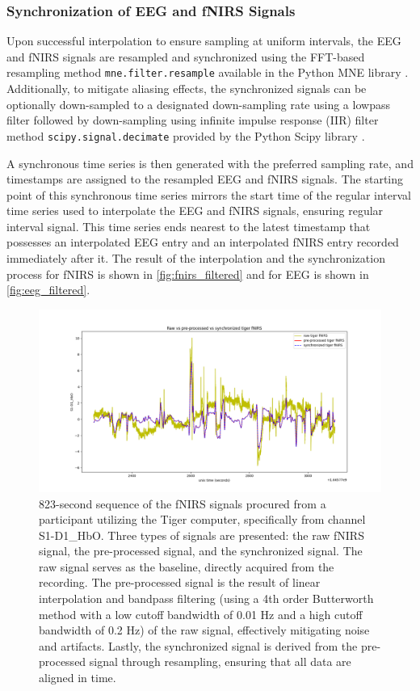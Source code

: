 \subsubsection{Synchronization of EEG and fNIRS Signals}

Upon successful interpolation to ensure sampling at uniform intervals, the EEG
and fNIRS signals are resampled and synchronized using the FFT-based resampling
method \texttt{mne.filter.resample} available in the Python MNE library
\cite{GramfortEtAl2013a}. Additionally, to mitigate aliasing effects, the
synchronized signals can be optionally down-sampled to a designated
down-sampling rate using a lowpass filter followed by down-sampling using
infinite impulse response (IIR) filter method \texttt{scipy.signal.decimate}
provided by the Python Scipy library \cite{2020SciPy-NMeth}.

A synchronous time series is then generated with the preferred sampling rate,
and timestamps are assigned to the resampled EEG and fNIRS signals. The
starting point of this synchronous time series mirrors the start time of the
regular interval time series used to interpolate the EEG and fNIRS signals,
ensuring regular interval signal. This time series ends nearest to the latest
timestamp that possesses an interpolated EEG entry and an interpolated fNIRS
entry recorded immediately after it. The result of the interpolation and the
synchronization process for fNIRS is shown in \autoref{fig:fnirs_filtered} and
for EEG is shown in \autoref{fig:eeg_filtered}.

\begin{figure}[h]
  \centering
  \includegraphics[width=\textwidth]{images/fnirs_filtered}
  \caption{%
    823-second sequence of the fNIRS signals procured from a participant
    utilizing the Tiger computer, specifically from channel S1-D1\_HbO. Three
    types of signals are presented: the raw fNIRS signal, the pre-processed
    signal, and the synchronized signal. The raw signal serves as the baseline,
    directly acquired from the recording. The pre-processed signal is the
    result of linear interpolation and bandpass filtering (using a 4th order
    Butterworth method with a low cutoff bandwidth of 0.01 Hz and a high cutoff
    bandwidth of 0.2 Hz) of the raw signal, effectively mitigating noise and
    artifacts. Lastly, the synchronized signal is derived from the
    pre-processed signal through resampling, ensuring that all data are aligned
    in time.
}
  \label{fig:fnirs_filtered}
\end{figure}

